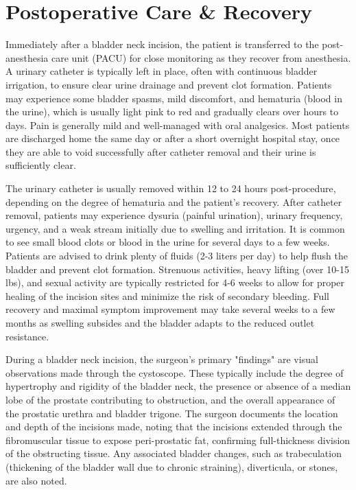 \section*{Postoperative Care \& Recovery}
Immediately after a bladder neck incision, the patient is transferred to the post-anesthesia care unit (PACU) for close monitoring as they recover from anesthesia. A urinary catheter is typically left in place, often with continuous bladder irrigation, to ensure clear urine drainage and prevent clot formation. Patients may experience some bladder spasms, mild discomfort, and hematuria (blood in the urine), which is usually light pink to red and gradually clears over hours to days. Pain is generally mild and well-managed with oral analgesics. Most patients are discharged home the same day or after a short overnight hospital stay, once they are able to void successfully after catheter removal and their urine is sufficiently clear.

The urinary catheter is usually removed within 12 to 24 hours post-procedure, depending on the degree of hematuria and the patient's recovery. After catheter removal, patients may experience dysuria (painful urination), urinary frequency, urgency, and a weak stream initially due to swelling and irritation. It is common to see small blood clots or blood in the urine for several days to a few weeks. Patients are advised to drink plenty of fluids (2-3 liters per day) to help flush the bladder and prevent clot formation. Strenuous activities, heavy lifting (over 10-15 lbs), and sexual activity are typically restricted for 4-6 weeks to allow for proper healing of the incision sites and minimize the risk of secondary bleeding. Full recovery and maximal symptom improvement may take several weeks to a few months as swelling subsides and the bladder adapts to the reduced outlet resistance.

During a bladder neck incision, the surgeon's primary "findings" are visual observations made through the cystoscope. These typically include the degree of hypertrophy and rigidity of the bladder neck, the presence or absence of a median lobe of the prostate contributing to obstruction, and the overall appearance of the prostatic urethra and bladder trigone. The surgeon documents the location and depth of the incisions made, noting that the incisions extended through the fibromuscular tissue to expose peri-prostatic fat, confirming full-thickness division of the obstructing tissue. Any associated bladder changes, such as trabeculation (thickening of the bladder wall due to chronic straining), diverticula, or stones, are also noted.

